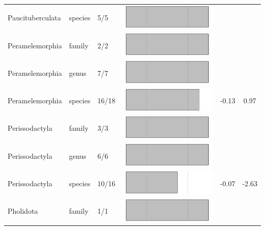 \begin{longtable}{lL{1.8cm}C{2cm}lcc}
  Paucituberculata & species & 5/5 & \includegraphics[width=0.20\linewidth, height=0.05\linewidth]{Supplementaries/Figures/Chapter2/Results_1c/Table_figures/bar51.pdf} &   &   \\ 
  Peramelemorphia & family & 2/2 & \includegraphics[width=0.20\linewidth, height=0.05\linewidth]{Supplementaries/Figures/Chapter2/Results_1c/Table_figures/bar52.pdf} &   &   \\ 
  Peramelemorphia & genus & 7/7 & \includegraphics[width=0.20\linewidth, height=0.05\linewidth]{Supplementaries/Figures/Chapter2/Results_1c/Table_figures/bar53.pdf} &   &   \\ 
  Peramelemorphia & species & 16/18 & \includegraphics[width=0.20\linewidth, height=0.05\linewidth]{Supplementaries/Figures/Chapter2/Results_1c/Table_figures/bar54.pdf} & -0.13 & 0.97 \\ 
  Perissodactyla & family & 3/3 & \includegraphics[width=0.20\linewidth, height=0.05\linewidth]{Supplementaries/Figures/Chapter2/Results_1c/Table_figures/bar55.pdf} &   &   \\ 
  Perissodactyla & genus & 6/6 & \includegraphics[width=0.20\linewidth, height=0.05\linewidth]{Supplementaries/Figures/Chapter2/Results_1c/Table_figures/bar56.pdf} &   &   \\ 
  Perissodactyla & species & 10/16 & \includegraphics[width=0.20\linewidth, height=0.05\linewidth]{Supplementaries/Figures/Chapter2/Results_1c/Table_figures/bar57.pdf} & -0.07 & -2.63 \\ 
  Pholidota & family & 1/1 & \includegraphics[width=0.20\linewidth, height=0.05\linewidth]{Supplementaries/Figures/Chapter2/Results_1c/Table_figures/bar58.pdf} &   &   \\ 

\end{longtable}
